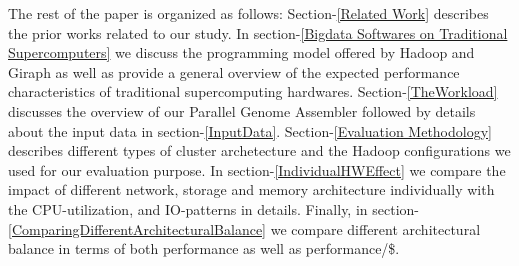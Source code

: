 \documentclass[conference]{IEEEtran}
\begin{document}
The rest of the paper is organized as follows:
Section-\ref{Related Work} describes the prior works related to our study.
In section-\ref{Bigdata Softwares on Traditional Supercomputers} we discuss the programming model offered by Hadoop and Giraph as well as provide a general overview of the expected performance characteristics of traditional supercomputing hardwares.
Section-\ref{TheWorkload} discusses the overview of our Parallel Genome Assembler followed by details about the input data in section-\ref{InputData}.
Section-\ref{Evaluation Methodology} describes different types of cluster archetecture and the Hadoop configurations we used for our evaluation purpose.
In section-\ref{IndividualHWEffect} we compare the impact of different network, storage and memory architecture individually with the CPU-utilization, and IO-patterns in details.
Finally, in section-\ref{ComparingDifferentArchitecturalBalance} we compare different architectural balance in terms of both performance as well as performance/\$.
\end{document}
